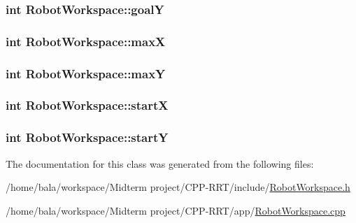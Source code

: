 \subsubsection[{\texorpdfstring{goalY}{goalY}}]{\setlength{\rightskip}{0pt plus 5cm}int Robot\+Workspace\+::goalY}\hypertarget{classRobotWorkspace_a45d9f2b0d0ecef22c04014c637524d0f}{}\label{classRobotWorkspace_a45d9f2b0d0ecef22c04014c637524d0f}
\subsubsection[{\texorpdfstring{maxX}{maxX}}]{\setlength{\rightskip}{0pt plus 5cm}int Robot\+Workspace\+::maxX}\hypertarget{classRobotWorkspace_aefd8b9990143c74d381c5e20e037fa0d}{}\label{classRobotWorkspace_aefd8b9990143c74d381c5e20e037fa0d}
\subsubsection[{\texorpdfstring{maxY}{maxY}}]{\setlength{\rightskip}{0pt plus 5cm}int Robot\+Workspace\+::maxY}\hypertarget{classRobotWorkspace_a69e5c23c432988088491bbbe29a55db6}{}\label{classRobotWorkspace_a69e5c23c432988088491bbbe29a55db6}
\subsubsection[{\texorpdfstring{startX}{startX}}]{\setlength{\rightskip}{0pt plus 5cm}int Robot\+Workspace\+::startX}\hypertarget{classRobotWorkspace_a128fe1cfa23f4b6e45a95832be792bc8}{}\label{classRobotWorkspace_a128fe1cfa23f4b6e45a95832be792bc8}
\subsubsection[{\texorpdfstring{startY}{startY}}]{\setlength{\rightskip}{0pt plus 5cm}int Robot\+Workspace\+::startY}\hypertarget{classRobotWorkspace_a9df5e122a5a24e38e076b7aae16a68c5}{}\label{classRobotWorkspace_a9df5e122a5a24e38e076b7aae16a68c5}


The documentation for this class was generated from the following files\+:\begin{DoxyCompactItemize}
\item 
/home/bala/workspace/\+Midterm project/\+C\+P\+P-\/\+R\+R\+T/include/\hyperlink{RobotWorkspace_8h}{Robot\+Workspace.\+h}\item 
/home/bala/workspace/\+Midterm project/\+C\+P\+P-\/\+R\+R\+T/app/\hyperlink{RobotWorkspace_8cpp}{Robot\+Workspace.\+cpp}\end{DoxyCompactItemize}
